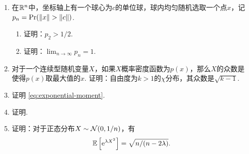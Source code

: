 \begin{enumerate}[wide,labelindent=0pt]
    \item \label{exercise:circle-sample} 在$\mathbb{R}^n$中，坐标轴上有一个球心为$c$的单位球，球内均匀随机选取一个点$x$，记$p_n=\Pr(\norm{x}>\norm{c})$. 
    \begin{enumerate}
        \item 证明：$p_2>1/2$.
        \item 证明：$\lim_{n\to\infty}p_n=1$.
    \end{enumerate}

    \item \label{exercise:chi-mode} 对于一个连续型随机变量$X$，如果$X$概率密度函数为$p(x)$，那么$X$的众数是使得$p(x)$取最大值的$x$. 证明：自由度为$k>1$的$\chi$分布，其众数是$\sqrt{k-1}$. 
    
    \item \label{exercise:expoential-moment} 证明 \eqref{eq:exponential-moment}. 
    
    \item \label{exercise:hoeffding-inequality-general} 证明. 
    
    \item \label{exercise:moment-of-gaussian} 证明：对于正态分布$X\sim\mathcal{N}(0,1/n)$，有
    \[\mathbb{E}\left[\mathrm{e}^{\lambda X^2}\right]=\sqrt{n/(n-2\lambda)}.\] 
\end{enumerate}